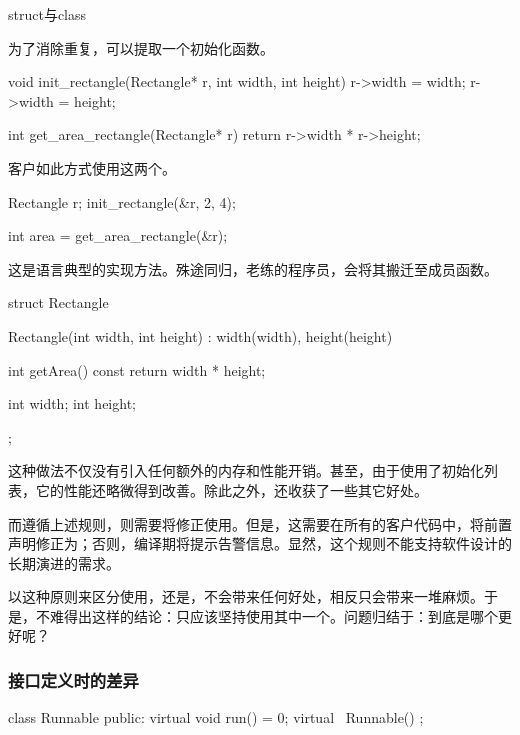 \begin{content}
\begin{episode}{struct与class}
\begin{content}
为了消除重复，可以提取一个初始化函数。

\begin{c++}
void init_rectangle(Rectangle* r, int width, int height) {
  r->width = width;
  r->width = height;
}

int get_area_rectangle(Rectangle* r) {
  return r->width * r->height;
}
\end{c++}

客户如此方式使用这两个。

\begin{c++}
Rectangle r;
init_rectangle(&r, 2, 4);

int area = get_area_rectangle(&r);
\end{c++}

这是\clang{}语言典型的实现方法。殊途同归，老练的程序员，会将其搬迁至成员函数。

\begin{c++}
struct Rectangle {
  Rectangle(int width, int height) : width(width), height(height) {
  }

  int getArea() const {
    return width * height;
  }

  int width;
  int height;
};
\end{c++}

这种做法不仅没有引入任何额外的内存和性能开销。甚至，由于使用了初始化列表，它的性能还略微得到改善。除此之外，还收获了一些其它好处。

\begin{enum}
\end{enum}

而遵循上述规则，则需要将修正使用。但是，这需要在所有的客户代码中，将前置声明修正为；否则，编译期将提示告警信息。显然，这个规则不能支持软件设计的长期演进的需求。

以这种原则来区分使用，还是，不会带来任何好处，相反只会带来一堆麻烦。于是，不难得出这样的结论：只应该坚持使用其中一个。问题归结于：到底是哪个更好呢？

\subsubsection{接口定义时的差异}

\begin{c++}
class Runnable {
public:
  virtual void run() = 0;
  virtual ~Runnable() {}
};


\end{c++}
\end{content}
\end{episode}
\end{content}
